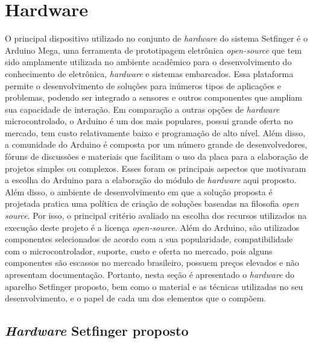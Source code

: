 \section{Hardware}

O principal dispositivo utilizado no conjunto de \textit{hardware} do sistema Setfinger é o Arduino Mega, uma ferramenta de prototipagem eletrônica \textit{open-source} que tem sido amplamente utilizada no ambiente acadêmico para o desenvolvimento do conhecimento de eletrônica, \textit{hardware} e sistemas embarcados. Essa plataforma permite o desenvolvimento de soluções para inúmeros tipos de aplicações e problemas, podendo ser integrado a sensores e outros componentes que ampliam sua capacidade de interação. Em comparação a outras opções de \textit{hardware} microcontrolado, o Arduino é um dos mais populares, possui grande oferta no mercado, tem custo relativamente baixo e programação de alto nível. Além disso, a comunidade do Arduino é composta por um número grande de desenvolvedores, fóruns de discussões e materiais que facilitam o uso da placa para a elaboração de projetos simples ou complexos. Esses foram os principais aspectos que motivaram a escolha do Arduino para a elaboração do módulo de \textit{hardware} aqui proposto. Além disso, o ambiente de desenvolvimento em que a solução proposta é projetada pratica uma política de criação de soluções baseadas na filosofia \textit{open source}. Por isso, o principal critério avaliado na escolha dos recursos utilizados na execução deste projeto é a licença \textit{open-source}. Além do Arduino, são utilizados componentes selecionados de acordo com a sua popularidade, compatibilidade com o microcontrolador, suporte, custo e oferta no mercado, pois alguns componentes são escassos no mercado brasileiro, possuem preços elevados e não apresentam documentação. Portanto, nesta seção é apresentado o \textit{hardware} do aparelho Setfinger proposto, bem como o material e as técnicas utilizadas no seu desenvolvimento, e o papel de cada um dos elementos que o compõem.


\subsection{\textit{Hardware} Setfinger proposto \label{hardware_setfingerproposto}}

